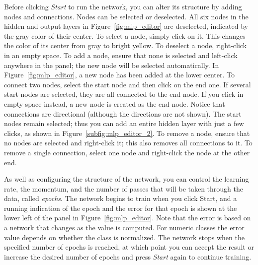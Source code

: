 Before clicking \textit{Start} to run the network, you can alter its
structure by adding nodes and connections. Nodes can be selected or
deselected. All six nodes in the hidden and output layers in
Figure~\ref{fig:mlp_editor} are deselected, indicated by the gray
color of their center. To select a node, simply click on it. This
changes the color of its center from gray to bright yellow. To
deselect a node, right-click in an empty space. To add a node, ensure
that none is selected and left-click anywhere in the panel; the new
node will be selected automatically. In Figure~\ref{fig:mlp_editor}, a
new node has been added at the lower center. To connect two nodes,
select the start node and then click on the end one. If several start
nodes are selected, they are all connected to the end node. If you
click in empty space instead, a new node is created as the end
node. Notice that connections are directional (although the directions
are not shown). The start nodes remain selected; thus you can add an
entire hidden layer with just a few clicks, as shown in
Figure~\ref{subfig:mlp_editor_2}. To remove a node, ensure that no nodes
are selected and right-click it; this also removes all connections to
it. To remove a single connection, select one node and right-click the
node at the other end.

As well as configuring the structure of the network, you can control
the learning rate, the momentum, and the number of passes that will be
taken through the data, called \textit{epochs}. The network begins to
train when you click Start, and a running indication of the epoch and
the error for that epoch is shown at the lower left of the panel in
Figure~\ref{fig:mlp_editor}. Note that the error is based on a network
that changes as the value is computed. For numeric classes the error
value depends on whether the class is normalized. The network stops
when the specified number of epochs is reached, at which point you can
accept the result or increase the desired number of epochs and press
\textit{Start} again to continue training.

